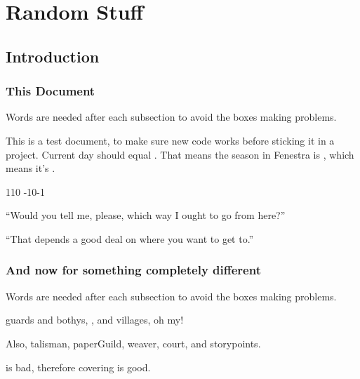 \documentclass[a4paper,openany]{book}
\date{\today}
\begin{document}
\frontmatter

\chapter{Random Stuff}

\section{Introduction}

\begin{multicols}{2}

\subsection{This Document}
Words are needed after each subsection to avoid the boxes making problems.



This is a test document, to make sure new code works before sticking it in a project.
Current day should equal .
That means the season in Fenestra is \showSeason, which means it's \showTemperature.

%
  {{1}{1}{0}}%
  {{-1}{0}{-1}}%
  {%
    \spear
    \partialchain
  }%
  {}%
  {\lootMedium}%
  {}%



\begin{speechtext}

  ``Would you tell me, please, which way I ought to go from here?''

  ``That depends a good deal on where you want to get to.''

\end{speechtext}

\subsection{And now for something completely different}
Words are needed after each subsection to avoid the boxes making problems.



\Glspl{guard} and \glspl{bothy}, , and \glspl{village}, oh my!

Also, \gls{talisman}, \gls{paperGuild}, \gls{weaver}, \gls{court}, and \glspl{storypoint}.

 is bad, therefore \gls{covering} is good.


\end{multicols}
\end{document}
